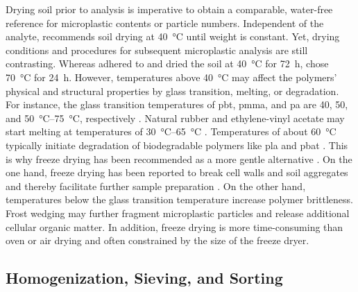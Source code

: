 Drying soil prior to analysis is imperative to obtain a comparable, water-free reference for microplastic contents or particle numbers. Independent of the analyte, \citet{ISO11464Soil2006} recommends soil drying at \SI{40}{\degreeCelsius} until weight is constant. Yet, drying conditions and procedures for subsequent microplastic analysis are still contrasting. Whereas \citet{vandenBergSewage2020} adhered to \citet{ISO11464Soil2006} and dried the soil at \SI{40}{\degreeCelsius} for \SI{72}{\hour}, \citet{LiuMicroplastic2018} chose \SI{70}{\degreeCelsius} for \SI{24}{\hour}.
However, temperatures above \SI{40}{\degreeCelsius} may affect the polymers' physical and structural properties by glass transition, melting, or degradation. For instance, the glass transition temperatures of \ac{pbt}, \ac{pmma}, and \ac{pa} are \num{40}, \num{50}, and \SIrange{50}{75}{\degreeCelsius}, respectively \citep{BeylerThermal2002}. Natural rubber and ethylene-vinyl acetate may start melting at temperatures of \SIrange{30}{65}{\degreeCelsius} \citep{BeylerThermal2002}. Temperatures of about \SI{60}{\degreeCelsius} typically initiate degradation of biodegradable polymers like \ac{pla} and \ac{pbat} \citep{BurgstallerStudy2018}. This is why freeze drying has been recommended as a more gentle alternative \citep{EndersWhen2020}. On the one hand, freeze drying has been reported to break cell walls and soil aggregates and thereby facilitate further sample preparation \citep{EndersWhen2020}. On the other hand, temperatures below the glass transition temperature increase polymer brittleness.
Frost wedging may further fragment microplastic particles and release additional cellular organic matter. In addition, freeze drying is more time-consuming than oven or air drying and often constrained by the size of the freeze dryer.

\subsection{Homogenization, Sieving, and Sorting}
\label{sec:analytical-techniques:homogenization}

